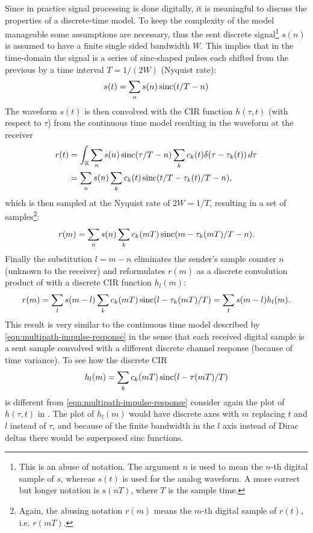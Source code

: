 Since in practice signal processing is done digitally, it is meaningful to discuss the properties of a discrete-time model. To keep the complexity of the model manageable some assumptions are necessary, thus the sent discrete signal\footnote{This is an abuse of notation. The argument \(n\) is used to mean the \(n\)-th digital sample of \(s\), whereas \(s(t)\) is used for the analog waveform. A more correct but longer notation is \(s(nT)\), where \(T\) is the sample time.} \(s(n)\) is assumed to have a finite single sided bandwidth \(W\). This implies that in the time-domain the signal is a series of sinc-shaped pulses each shifted from the previous by a time interval \(T = 1 / (2W)\) (Nyquist rate):
\begin{equation}
	s(t) = \sum_n s(n) \operatorname{sinc}(t/T - n)
\end{equation}
The waveform \(s(t)\) is then convolved with the CIR function \(h(\tau, t)\) (with respect to \(\tau\)) from the continuous time model resulting in the waveform at the receiver
\begin{align*}
	r(t) &= \int_ \mathbb{R} \sum_n s(n) \operatorname{sinc}(\tau / T - n) \sum_k c_k(t) \delta(\tau - \tau_k(t)) \,d\tau \\
	&= \sum_n s(n) \sum_k c_k(t) \operatorname{sinc}(t/T - \tau_k(t)/T - n),
\end{align*}
which is then sampled at the Nyquist rate of \(2W = 1/T\), resulting in a set of samples\footnote{Again, the abusing notation \(r(m)\) means the \(m\)-th digital sample of \(r(t)\), i.e. \(r(mT)\).}:
\[
	r(m) = \sum_n s(n) \sum_k c_k(mT) \operatorname{sinc}(m - \tau_k(mT)/T - n).
\]
Finally the substitution \(l = m - n\) eliminates the sender's sample counter \(n\) (unknown to the receiver) and reformulates \(r(m)\) as a discrete convolution product of with a discrete CIR function \(h_l(m)\):
\begin{equation}
	r(m) = \sum_l s(m - l) \sum_k c_k(mT) \operatorname{sinc}(l - \tau_k(mT)/T) 
	= \sum_l s(m - l) h_l (m).
\end{equation}
This result is very similar to the continuous time model described by \eqref{eqn:multipath-impulse-response} in the sense that each received digital sample is a sent sample convolved with a different discrete channel response (because of time variance). To see how the discrete CIR
\begin{equation} \label{eqn:discrete-multipath-impulse-response}
	h_l(m) = \sum_k c_k(mT) \operatorname{sinc}(l - \tau(mT)/T)
\end{equation}
is different from \eqref{eqn:multipath-impulse-response} consider again the plot of \(h(\tau,t)\) in . The plot of \(h_l(m)\) would have discrete axes with \(m\) replacing \(t\) and \(l\) instead of \(\tau\), and because of the finite bandwidth in the \(l\) axis instead of Dirac deltas there would be superposed sinc functions.

